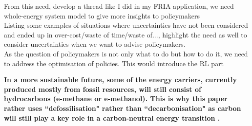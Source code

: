 From this need, develop a thread like I did in my FRIA application, we need whole-energy system model to give more insights to policymakers\\

Listing some examples of situations where uncertainties have not been considered and ended up in over-cost/waste of time/waste of..., highlight the need as well to consider uncertainties when we want to advise policymakers.\\

As the question of policymakers is not only what to do but how to do it, we need to address the optimisation of policies. This would introduce the RL part


\textbf{In a more sustainable future, some of the energy carriers, currently produced mostly from fossil resources, will still consist of hydrocarbons (\eg e-methane or e-methanol). This is why this paper rather uses ``defossilisation" rather than ``decarbonisation" as carbon will still play a key role in a carbon-neutral energy transition \cite{mertens2020carbon}.}



